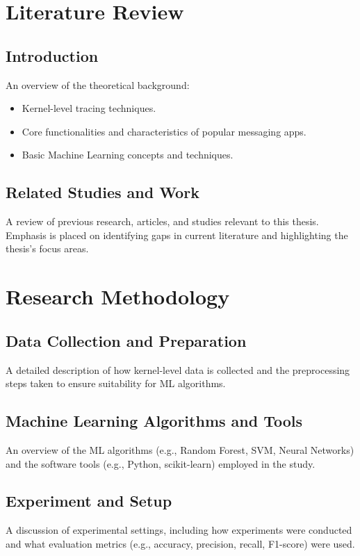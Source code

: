 \documentclass[a4paper,12pt]{report}
\begin{document}
\chapter{Literature Review}

\section{Introduction}
An overview of the theoretical background:
\begin{itemize}
    \item Kernel-level tracing techniques.
    \item Core functionalities and characteristics of popular messaging apps.
    \item Basic Machine Learning concepts and techniques.
\end{itemize}

\section{Related Studies and Work}
A review of previous research, articles, and studies relevant to this thesis. Emphasis is placed on identifying gaps in current literature and highlighting the thesis’s focus areas.

\chapter{Research Methodology}

\section{Data Collection and Preparation}
A detailed description of how kernel-level data is collected and the preprocessing steps taken to ensure suitability for ML algorithms.

\section{Machine Learning Algorithms and Tools}
An overview of the ML algorithms (e.g., Random Forest, SVM, Neural Networks) and the software tools (e.g., Python, scikit-learn) employed in the study.

\section{Experiment and Setup}
A discussion of experimental settings, including how experiments were conducted and what evaluation metrics (e.g., accuracy, precision, recall, F1-score) were used.
\end{document}
